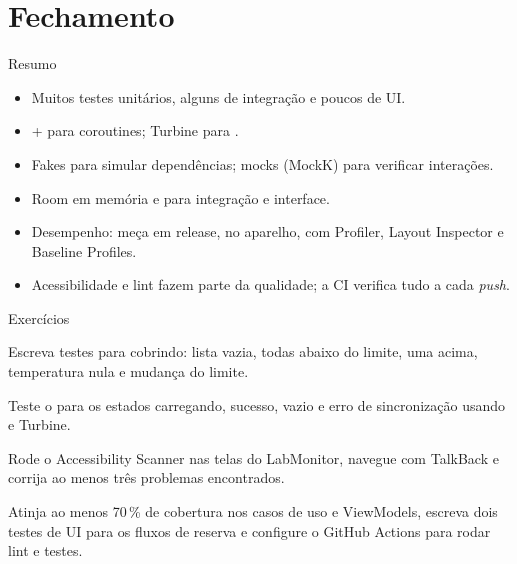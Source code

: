 \documentclass[aspectratio=169,10pt]{beamer}
\begin{document}
\section{Fechamento}

\begin{frame}{Resumo}
  \begin{resumo}
    \begin{itemize}
      \item Muitos testes unitários, alguns de integração e poucos de UI.
      \item {} +  para coroutines; Turbine para .
      \item Fakes para simular dependências; mocks (MockK) para verificar interações.
      \item Room em memória e  para integração e interface.
      \item Desempenho: meça em release, no aparelho, com Profiler, Layout Inspector e Baseline Profiles.
      \item Acessibilidade e lint fazem parte da qualidade; a CI verifica tudo a cada \emph{push}.
    \end{itemize}
  \end{resumo}
\end{frame}

\begin{frame}{Exercícios}
  \begin{exercicio}
    Escreva testes para  cobrindo: lista vazia, todas abaixo do limite, uma acima, temperatura nula e mudança do limite.
  \end{exercicio}
  \begin{exercicio}
    Teste o  para os estados carregando, sucesso, vazio e erro de sincronização usando  e Turbine.
  \end{exercicio}
  \begin{exercicio}
    Rode o Accessibility Scanner nas telas do LabMonitor, navegue com TalkBack e corrija ao menos três problemas encontrados.
  \end{exercicio}
  \begin{projeto}
    Atinja ao menos 70\,\% de cobertura nos casos de uso e ViewModels, escreva dois testes de UI para os fluxos de reserva e configure o GitHub Actions para rodar lint e testes.
  \end{projeto}
\end{frame}
\end{document}
